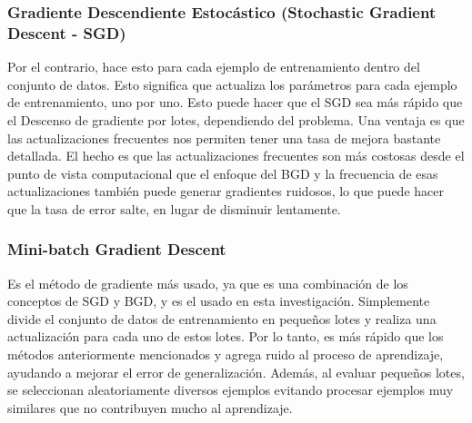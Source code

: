 		\subsubsection{Gradiente Descendiente Estocástico (Stochastic Gradient Descent - SGD)}

			Por el contrario, hace esto para cada ejemplo de entrenamiento dentro del conjunto de datos. Esto significa que actualiza los parámetros para cada ejemplo de entrenamiento, uno por uno. Esto puede hacer que el SGD sea más rápido que el Descenso de gradiente por lotes, dependiendo del problema. Una ventaja es que las actualizaciones frecuentes nos permiten tener una tasa de mejora bastante detallada. El hecho es que las actualizaciones frecuentes son más costosas desde el punto de vista computacional que el enfoque del BGD y la frecuencia de esas actualizaciones también puede generar gradientes ruidosos, lo que puede hacer que la tasa de error salte, en lugar de disminuir lentamente.


		\subsubsection{Mini-batch Gradient Descent}

			Es el método de gradiente más usado, ya que es una combinación de los conceptos de SGD y BGD, y es el usado en esta investigación. Simplemente divide el conjunto de datos de entrenamiento en pequeños lotes y realiza una actualización para cada uno de estos lotes. Por lo tanto, es más rápido que los métodos anteriormente mencionados y agrega ruido al proceso de aprendizaje, ayudando a mejorar el error de generalización. Además, al evaluar pequeños lotes, se seleccionan aleatoriamente diversos ejemplos evitando procesar ejemplos muy similares que no contribuyen mucho al aprendizaje. %

